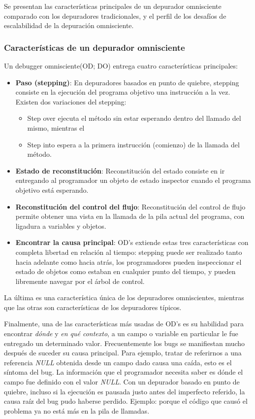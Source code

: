 \documentclass[12pt,legalpaper]{report}
\begin{document}
	Se presentan las características principales de un depurador omnisciente comparado con los depuradores tradicionales, y el perfil de los desafíos de escalabilidad de la depuración omnisciente.

			\subsubsection[Características]{Características de un depurador omnisciente \label{caracteristicasDepurador}}

	Un debugger omnisciente(OD; DO) entrega cuatro características principales:
\begin{itemize}
	\item \textbf{Paso (stepping)}: En depuradores basados en punto de quiebre, stepping consiste en la ejecución del programa objetivo una instrucción a la vez.  Existen dos variaciones del stepping:
	\begin{itemize}
		\item Step over ejecuta el método sin estar esperando dentro del llamado del mismo, mientras el 
		\item Step into espera a la primera instrucción (comienzo) de la llamada del método.	\end{itemize}	
	
	\item \textbf{Estado de reconstitución}: Reconstitución del estado consiste en ir entregando al programador un objeto de estado inspector cuando el programa objetivo está esperando.		
	\item \textbf{Reconstitución del control del flujo}: Reconstitución del control de flujo permite obtener una vista en la llamada de la pila actual del programa, con ligadura a variables y objetos.	
	\item \textbf{Encontrar la causa principal}: OD's extiende estas tres características con completa libertad en relación al tiempo:  stepping puede ser realizado tanto hacia adelante como hacia atrás, los programadores pueden inspeccionar el estado de objetos como estaban en cualquier punto del tiempo, y pueden libremente navegar por el árbol de control.	
	
\end{itemize}
La última es una característica única de los depuradores omniscientes, mientras que las otras son características de los depuradores típicos.

	Finalmente, una de las características más usadas de OD's es su habilidad para encontrar \textit{dónde} y \textit{en qué contexto}, a un campo o variable en particular le fue entregado un determinado valor.  Frecuentemente los bugs se manifiestan mucho después de suceder su causa principal.  Para ejemplo, tratar de referirnos a una referencia \textit{NULL} obtenida desde un campo dado causa una caída, esto es el síntoma del bug.  La información que el programador necesita saber es dónde el campo fue definido con el valor \textit{NULL}.  Con un depurador basado en punto de quiebre, incluso si la ejecución es pausada justo antes del imperfecto referido, la causa raíz del bug pudo haberse perdido.  Ejemplo:  porque el código que causó el problema ya no está más en la pila de llamadas.
\end{document}
